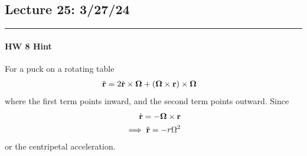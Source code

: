 \documentclass[../main.tex]{subfiles}
\begin{document}
\newpage
\subsection*{Lecture 25: \hfill 3/27/24}
\hrule \vspace{10px}

\paragraph*{HW 8 Hint} For a puck on a rotating table
\begin{align*}
    \ddot{\vb r} &= 2\dot{\vb r} \times \vb \Omega + (\vb \Omega \times \vb r) \times \vb \Omega
\end{align*}
where the first term points inward, and the second term points outward. Since
\begin{align*}
    \dot{\vb r} = - \vb \Omega \times \vb r \\
    \implies \ddot{\vb r} = - r \Omega^2
\end{align*}
or the centripetal acceleration. 
\end{document}
